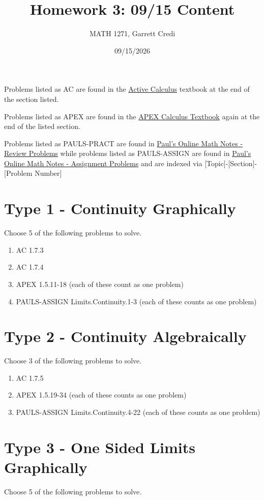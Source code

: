 \documentclass[12pt]{article}
\title{Homework 3: 09/15 Content}
\author{MATH 1271, Garrett Credi}
\date{09/15/2026}
\begin{document}
\maketitle

Problems listed as AC are found in the \href{https://activecalculus.org/single1e/frontmatter.html}{Active Calculus} 
textbook at the end of the section listed.

Problems listed as APEX are found in the \href{https://opentext.uleth.ca/apex-calculus/apex-calculus.html}{APEX Calculus Textbook}
again at the end of the listed section.

Problems listed as PAULS-PRACT are found in \href{https://tutorial.math.lamar.edu/Problems/CalcI/CalcI.aspx}{Paul's Online Math Notes - Review Problems}
while problems listed as PAULS-ASSIGN are found in \href{https://tutorial.math.lamar.edu/ProblemsNS/CalcI/CalcI.aspx}{Paul's Online Math Notes - Assignment Problems}
and are indexed via [Topic]-[Section]-[Problem Number]

\section{Type 1 - Continuity Graphically}
Choose 5 of the following problems to solve.

\begin{enumerate}
  \item AC 1.7.3
  \item AC 1.7.4
  \item APEX 1.5.11-18 (each of these count as one problem)
  \item PAULS-ASSIGN Limits.Continuity.1-3 (each of these counts as one problem)
\end{enumerate}

\section{Type 2 - Continuity Algebraically}
Choose 3 of the following problems to solve.

\begin{enumerate}
  \item AC 1.7.5
  \item APEX 1.5.19-34 (each of these counts as one problem)
  \item PAULS-ASSIGN Limits.Continuity.4-22 (each of these counts as one problem)
\end{enumerate}

\section{Type 3 - One Sided Limits Graphically}
Choose 5 of the following problems to solve.
\end{document}
